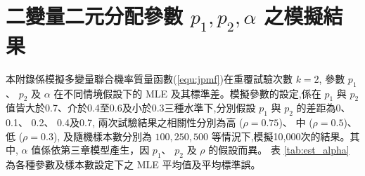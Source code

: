 %
%

\chapter{二變量二元分配參數 $p_1, p_2, \alpha$ 之模擬結果}\label{ch:appendix_afa}

\noindent 本附錄係模擬多變量聯合機率質量函數(\ref{equ:jpmf})在重覆試驗次數 $k=2$, 參數 $p_1$、 $p_2$ 及 $\alpha$ 在不同情境假設下的 MLE 及其標準差。模擬參數的設定,係在 $p_1$ 與 $p_2$ 值皆大於0.7、介於0.4至0.6及小於0.3三種水準下,分別假設 $p_1$ 與 $p_2$ 的差距為0、 0.1、 0.2、 0.4及0.7, 兩次試驗結果之相關性分別為高 ($\rho=0.75$)、 中 ($\rho=0.5$)、 低 ($\rho=0.3$), 及隨機樣本數分別為 $100, 250, 500$ 等情況下,模擬10,000次的結果。其中, $\alpha$ 值係依第三章模型產生，因 $p_1$、 $p_2$ 及 $\rho$ 的假設而異。
表 \ref{tab:est_alpha} 為各種參數及樣本數設定下之 MLE 平均值及平均標準誤。

